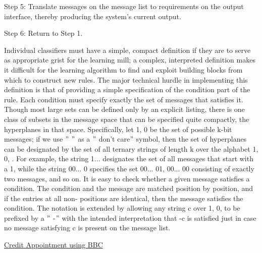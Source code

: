 \documentclass[12pt]{article}
\renewcommand{\_}{\kern-1.5pt\textunderscore\kern-1.5pt}
\begin{document}
Step 5: Translate messages on the message list to requirements on the output interface, thereby producing the system’s current output. \par

Step 6: Return to Step 1. \par

Individual classifiers must have a simple, compact definition if they are to serve as appropriate grist for the learning mill; a complex, interpreted definition makes it difficult for the learning algorithm to find and exploit building blocks from which to construct new rules. The major technical hurdle in implementing this definition is that of providing a simple specification of the condition part of the rule. Each condition must specify exactly the set of messages that satisfies it. Though most large sets can be defined only by an explicit listing, there is one class of subsets in the message space that can be specified quite compactly, the hyperplanes in that space. Specifically, let 1, 0 be the set of possible k-bit messages; if we use $"$ $"$  as a $"$ don’t care$"$  symbol, then the set of hyperplanes can be designated by the set of all ternary strings of length k over the alphabet 1, 0, . For example, the string 1... designates the set of all messages that start with a 1, while the string 00... 0 specifies the set 00... 01, 00... 00 consisting of exactly two messages, and so on. It is easy to check whether a given message satisfies a condition. The condition and the message are matched position by position, and if the entries at all non- positions are identical, then the message satisfies the condition. The notation is extended by allowing any string c over 1, 0, to be prefixed by a $"$ -$"$  with the intended interpretation that -c is satisfied just in case no message satisfying c is present on the message list.\par

{\fontsize{14pt}{16.8pt}\selectfont \uline{Credit Appointment using BBC }\par}\par
\end{document}

